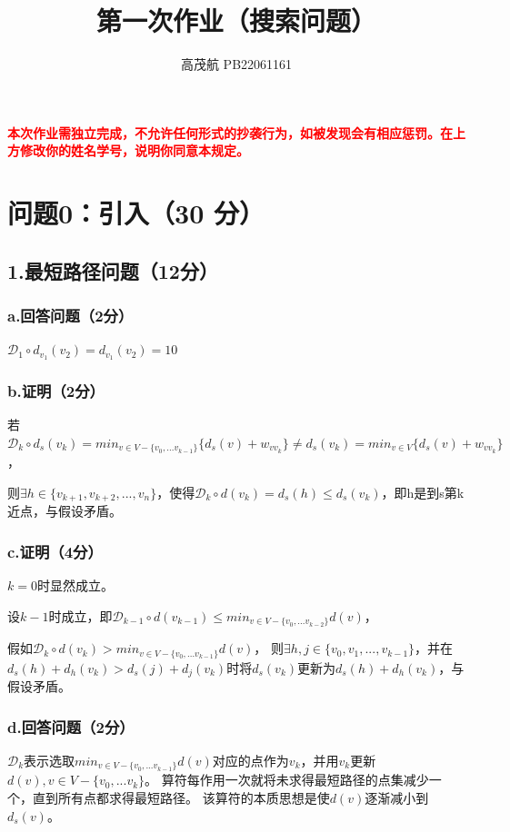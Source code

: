 \documentclass{article}
\title{\bfseries 第一次作业（搜索问题）}
\author{高茂航  \quad  PB22061161}
\begin{document}
\maketitle
\textcolor{red}{\textbf{本次作业需独立完成，不允许任何形式的抄袭行为，如被发现会有相应惩罚。在上方修改你的姓名学号，说明你同意本规定。}}

\section*{问题0：引入（30 分）}
\subsection*{1.最短路径问题（12分）}
\subsubsection*{a.回答问题（2分）}
$\mathcal{D}_1 \circ d_{v_1}(v_2)=d_{v_1}(v_2)=10$
\subsubsection*{b.证明（2分）}
若$\mathcal{D}_k \circ d_{s}(v_k)=min_{v \in V-\{v_0,...v_{k-1}\}}\{d_s(v)+w_{vv_k}\}\neq d_s(v_k)=min_{v\in V}\{d_s(v)+w_{vv_k}\}$，

则$\exists h \in \{v_{k+1},v_{k+2},...,v_{n}\}$，使得$\mathcal{D}_k \circ d(v_k)=d_s(h)\leqslant d_s(v_k)$，即h是到s第k近点，与假设矛盾。

\subsubsection*{c.证明（4分）}
$k=0$时显然成立。

设$k-1$时成立，即$\mathcal{D}_{k-1} \circ d(v_{k-1})\leqslant min_{v \in V-\{v_0,...v_{k-2}\}}d(v)$，

假如$\mathcal{D}_{k} \circ d(v_k)> min_{v \in V-\{v_0,...v_{k-1}\}}d(v)$，
则$\exists h,j \in \{v_{0},v_{1},...,v_{k-1}\}$，并在$d_s(h)+d_h(v_k)>d_s(j)+d_j(v_k)$时将$d_s(v_k)$更新为$d_s(h)+d_h(v_k)$，与假设矛盾。

\subsubsection*{d.回答问题（2分）}
$\mathcal{D}_{k}$表示选取$min_{v \in V-\{v_0,...v_{k-1}\}}d(v)$对应的点作为$v_k$，并用$v_k$更新$d(v),v\in V-\{v_0,...v_{k}\}$。
算符每作用一次就将未求得最短路径的点集减少一个，直到所有点都求得最短路径。
该算符的本质思想是使$d(v)$逐渐减小到$d_s(v)$。
\end{document}
